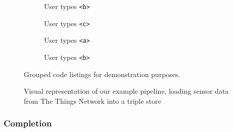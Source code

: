 \begin{figure}[htb]
    \centering
    \begin{subfigure}{0.2\textwidth}
      
      \caption{User types \texttt{<b>}}
      \label{code1}
    \end{subfigure}
    \hfill
    \begin{subfigure}{0.2\textwidth}
      
      \caption{User types \texttt{<c>}}
      \label{code2}
    \end{subfigure}
    \hfill
    \begin{subfigure}{0.2\textwidth}
      
      \caption{User types \texttt{<a>}}
      \label{code3}
    \end{subfigure}
    \hfill
    \begin{subfigure}{0.2\textwidth}
      
      \caption{User types \texttt{<b>}}
      \label{code4}
    \end{subfigure}
    \caption{Grouped code listings for demonstration purposes.}\label{lst:GroupedListing}
\end{figure}


\begin{figure}[!ht]
 \centering
  \caption{Visual representation of our example pipeline, 
      loading sensor data from The Things Network into a triple store}\label{fig:Parse}
\end{figure}


\subsubsection*{Completion}


